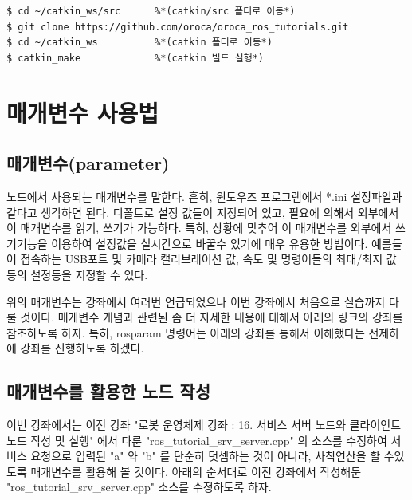\begin{lstlisting}[language=ROS]
$ cd ~/catkin_ws/src      %*(catkin/src 폴더로 이동*)
$ git clone https://github.com/oroca/oroca_ros_tutorials.git
$ cd ~/catkin_ws          %*(catkin 폴더로 이동*)
$ catkin_make             %*(catkin 빌드 실행*)
\end{lstlisting}

\section{매개변수 사용법}

\subsection{매개변수(parameter)}

\begin{definition*}\label{def:RosParameter}
노드에서 사용되는 매개변수를 말한다. 흔히, 윈도우즈 프로그램에서 *.ini 설정파일과 같다고 생각하면 된다. 디폴트로 설정 값들이 지정되어 있고, 필요에 의해서 외부에서 이 매개변수를 읽기, 쓰기가 가능하다. 특히, 상황에 맞추어 이 매개변수를 외부에서 쓰기기능을 이용하여 설정값을 실시간으로 바꿀수 있기에 매우 유용한 방법이다. 예를들어 접속하는 USB포트 및 카메라 캘리브레이션 값, 속도 및 명령어들의 최대/최저 값 등의 설정등을 지정할 수 있다.
\end{definition*}

위의 매개변수는 강좌에서 여러번 언급되었으나 이번 강좌에서 처음으로 실습까지 다룰 것이다. 매개변수 개념과 관련된 좀 더 자세한 내용에 대해서 아래의 링크의 강좌를 참조하도록 하자. 특히, rosparam 명령어는 아래의 강좌를 통해서 이해했다는 전제하에 강좌를 진행하도록 하겠다.

\subsection{매개변수를 활용한 노드 작성}

이번 강좌에서는 이전 강좌 "로봇 운영체제 강좌 : 16. 서비스 서버 노드와 클라이언트 노드 작성 및 실행" 에서 다룬 "ros\_tutorial\_srv\_server.cpp" 의 소스를 수정하여 서비스 요청으로 입력된 "a" 와 "b" 를 단순히 덧셈하는 것이 아니라, 사칙연산을 할 수있도록 매개변수를 활용해 볼 것이다. 아래의 순서대로 이전 강좌에서 작성해둔 "ros\_tutorial\_srv\_server.cpp" 소스를 수정하도록 하자.

